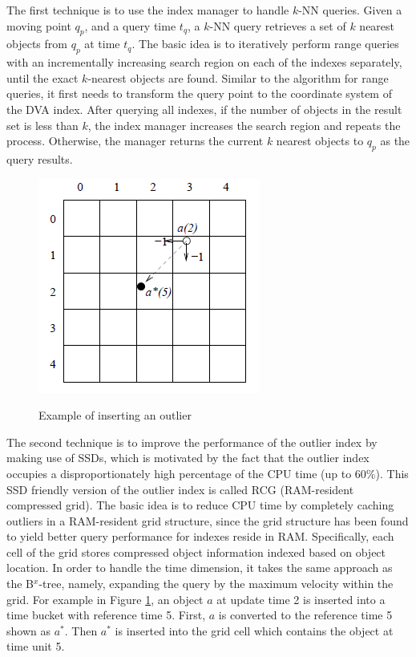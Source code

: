 \documentclass[paper=a4, fontsize=18pt]{article} %
\numberwithin{equation}{section} %
\numberwithin{figure}{section} %
\numberwithin{table}{section} %
\begin{document}
The first technique is to use the index manager to handle $k$-NN queries. Given a moving point $q_p$, and a query time $t_q$, a $k$-NN query retrieves a set of $k$ nearest objects from $q_p$ at time $t_q$. The basic idea is to iteratively perform range queries with an incrementally increasing search region on each of the indexes separately, until the exact $k$-nearest objects are found. Similar to the algorithm for range queries, it first needs to transform the query point to the coordinate system of the DVA index. After querying all indexes, if the number of objects in the result set is less than $k$, the index manager increases the search region and repeats the process. Otherwise, the manager returns the current $k$ nearest objects to $q_p$ as the query results.

\begin{figure}[h]
  \centering
  \includegraphics[width=.4\linewidth]{9_12_VP1.png}\\
  \caption{Example of inserting an outlier}\label{fig:VP1}
\end{figure}

The second technique is to improve the performance of the outlier index by making use of SSDs, which is motivated by the fact that the outlier index occupies a disproportionately high percentage of the CPU time (up to 60\%). This SSD friendly version of the outlier index is called RCG (RAM-resident compressed grid). The basic idea is to reduce CPU time by completely caching outliers in a RAM-resident grid structure, since the grid structure has been found to yield better query performance for indexes reside in RAM. Specifically, each cell of the grid stores compressed object information indexed based on object location. In order to handle the time dimension, it takes the same approach as the B$^x$-tree, namely, expanding the query by the maximum velocity within the grid. For example in Figure \ref{fig:VP1}, an object $a$ at update time 2 is inserted into a time bucket with reference time 5. First, $a$ is converted to the reference time 5 shown as $a^*$. Then $a^*$ is inserted into the grid cell which contains the object at time unit 5.
\end{document}
